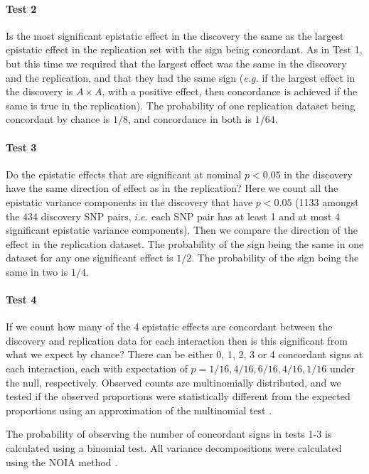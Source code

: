 \documentclass{article}
\begin{document}
\paragraph{Test 2} Is the most significant epistatic effect in the discovery the same as the largest epistatic effect in the replication set with the sign being concordant. As in Test 1, but this time we required that the largest effect was the same in the discovery and the replication, and that they had the same sign (\emph{e.g.} if the largest effect in the discovery is $A \times A$, with a positive effect, then concordance is achieved if the same is true in the replication). The probability of one replication dataset being concordant by chance is $1/8$, and concordance in both is $1/64$.

\paragraph{Test 3} Do the epistatic effects that are significant at nominal $p < 0.05$ in the discovery have the same direction of effect as in the replication? Here we count all the epistatic variance components in the discovery that have $p < 0.05$ (1133 amongst the 434 discovery SNP pairs, $i.e.$ each SNP pair has at least 1 and at most 4 significant epistatic variance components). Then we compare the direction of the effect in the replication dataset. The probability of the sign being the same in one dataset for any one significant effect is $1/2$. The probability of the sign being the same in two is $1/4$.

\paragraph{Test 4} If we count how many of the 4 epistatic effects are concordant between the discovery and replication data for each interaction then is this significant from what we expect by chance? There can be either 0, 1, 2, 3 or 4 concordant signs at each interaction, each with expectation of $p=1/16, 4/16, 6/16, 4/16, 1/16$ under the null, respectively. Observed counts are multinomially distributed, and we tested if the observed proportions were statistically different from the expected proportions using an approximation of the multinomial test \cite{Williams1976}.


The probability of observing the number of concordant signs in tests 1-3 is calculated using a binomial test. All variance decompositions were calculated using the NOIA method \cite{Alvarez-Castro2008}.
\end{document}
